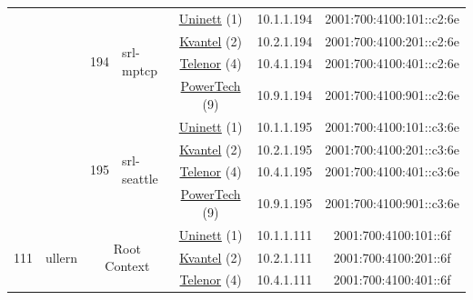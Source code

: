 \begin{small}
\begin{center}
\begin{longtable}{|c|c|c|c|c|c|c|c|}
  &  & \multirow{4}{*}{\tiny{194}} & \multicolumn{1}{|l|}{\multirow{4}{*}{\tiny{srl-mptcp}}} & \multicolumn{2}{|c|}{\tiny{\href{https://www.uninett.no}{Uninett} (1)}} & \tiny{10.1.1.194} & \tiny{2001:700:4100:101::c2:6e} \\* \cline{5-5}\cline{6-6}\cline{7-7}\cline{8-8}
  &  &  &  & \multicolumn{2}{|c|}{\tiny{\href{http://kvantel.no}{Kvantel} (2)}} & \tiny{10.2.1.194} & \tiny{2001:700:4100:201::c2:6e} \\* \cline{5-5}\cline{6-6}\cline{7-7}\cline{8-8}
  &  &  &  & \multicolumn{2}{|c|}{\tiny{\href{https://www.telenor.no}{Telenor} (4)}} & \tiny{10.4.1.194} & \tiny{2001:700:4100:401::c2:6e} \\* \cline{5-5}\cline{6-6}\cline{7-7}\cline{8-8}
  &  &  &  & \multicolumn{2}{|c|}{\tiny{\href{http://www.powertech.no}{PowerTech} (9)}} & \tiny{10.9.1.194} & \tiny{2001:700:4100:901::c2:6e} \\* \cline{3-3}\cline{4-4}\cline{5-5}\cline{6-6}\cline{7-7}\cline{8-8}
  &  & \multirow{4}{*}{\tiny{195}} & \multicolumn{1}{|l|}{\multirow{4}{*}{\tiny{srl-seattle}}} & \multicolumn{2}{|c|}{\tiny{\href{https://www.uninett.no}{Uninett} (1)}} & \tiny{10.1.1.195} & \tiny{2001:700:4100:101::c3:6e} \\* \cline{5-5}\cline{6-6}\cline{7-7}\cline{8-8}
  &  &  &  & \multicolumn{2}{|c|}{\tiny{\href{http://kvantel.no}{Kvantel} (2)}} & \tiny{10.2.1.195} & \tiny{2001:700:4100:201::c3:6e} \\* \cline{5-5}\cline{6-6}\cline{7-7}\cline{8-8}
  &  &  &  & \multicolumn{2}{|c|}{\tiny{\href{https://www.telenor.no}{Telenor} (4)}} & \tiny{10.4.1.195} & \tiny{2001:700:4100:401::c3:6e} \\* \cline{5-5}\cline{6-6}\cline{7-7}\cline{8-8}
  &  &  &  & \multicolumn{2}{|c|}{\tiny{\href{http://www.powertech.no}{PowerTech} (9)}} & \tiny{10.9.1.195} & \tiny{2001:700:4100:901::c3:6e} \\ \hline
 \multirow{28}{*}{\tiny{111}} & \multicolumn{1}{|l|}{\multirow{28}{*}{\tiny{ullern}}} & \multicolumn{2}{|c|}{\multirow{4}{*}{\tiny{Root Context}}} & \multicolumn{2}{|c|}{\tiny{\href{https://www.uninett.no}{Uninett} (1)}} & \tiny{10.1.1.111} & \tiny{2001:700:4100:101::6f} \\* \cline{5-5}\cline{6-6}\cline{7-7}\cline{8-8}
  &  & \multicolumn{2}{|c|}{} & \multicolumn{2}{|c|}{\tiny{\href{http://kvantel.no}{Kvantel} (2)}} & \tiny{10.2.1.111} & \tiny{2001:700:4100:201::6f} \\* \cline{5-5}\cline{6-6}\cline{7-7}\cline{8-8}
  &  & \multicolumn{2}{|c|}{} & \multicolumn{2}{|c|}{\tiny{\href{https://www.telenor.no}{Telenor} (4)}} & \tiny{10.4.1.111} & \tiny{2001:700:4100:401::6f} \\* \cline{5-5}\cline{6-6}\cline{7-7}\cline{8-8}

\end{longtable}
\end{center}
\end{small}
